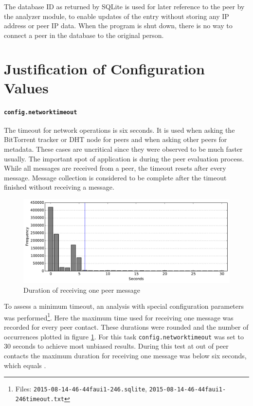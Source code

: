 \documentclass[10pt, a4paper, twoside, headsepline]{scrbook}
\renewcommand{\_}{\origunderscore\allowbreak}
\newcommand{\config}[1]{\texttt{config.\allowbreak #1}}
\begin{document}
The database ID as returned by SQLite is used for later reference to the peer by the analyzer module, to enable updates of the entry without storing any IP address or peer IP data. When the program is shut down, there is no way to connect a peer in the database to the original person.

\section{Justification of Configuration Values}
\paragraph{\config{network\_timeout}}
The timeout for network operations is six seconds. It is used when asking the BitTorrent tracker or DHT node for peers and when asking other peers for metadata. These cases are uncritical since they were observed to be much faster usually. The important spot of application is during the peer evaluation process. While all messages are received from a peer, the timeout resets after every message. Message collection is considered to be complete after the timeout finished without receiving a message.

\begin{figure}
\centering
\includegraphics[width=\textwidth]{graphics/2015-08-14_17-46-44_faui1-246_timeout}
\caption{Duration of receiving one peer message}
\label{timeout-calibration}
\end{figure}

To assess a minimum timeout, an analysis with special configuration parameters was performed\footnote{Files: \texttt{2015-08-14\_17-46-44\_faui1-246.sqlite}, \texttt{2015-08-14\_17-46-44\_faui1-246\_timeout.txt}}. Here the maximum time used for receiving one message was recorded for every peer contact. These durations were rounded and the number of occurrences plotted in figure \ref{timeout-calibration}. For this task \config{network\_timeout} was set to 30 seconds to achieve most unbiased results. During this test at  out of  peer contacts the maximum duration for receiving one message was below six seconds, which equals .
\end{document}
